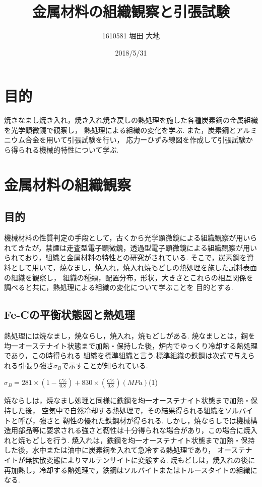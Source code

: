 \documentclass[10pt，a4j]{jsarticle}
\title{\vspace{-2.5cm}金属材料の組織観察と引張試験}
\author{1610581 堀田 大地}
\date{2018/5/31}
\begin{document}
\maketitle{}
\section{目的}
焼きなまし焼き入れ，焼き入れ焼き戻しの熱処理を施した各種炭素鋼の金属組織を光学顕微鏡で観察し，
熱処理による組織の変化を学ぶ.
また，炭素鋼とアルミニウム合金を用いて引張試験を行い，
応力ーひずみ線図を作成して引張試験から得られる機械的特性について学ぶ.
\section{金属材料の組織観察}
  \subsection{目的}
  機械材料の性質判定の手段として，古くから光学顕微鏡による組織観察が用いられてきたが，禁煙は走査型電子顕微鏡，透過型電子顕微鏡による組織観察が用いられており，組織と金属材料の特性との研究がされている.
  そこで，炭素鋼を資料として用いて，焼なまし，焼入れ，焼入れ焼もどしの熱処理を施した試料表面の組織を観察し，
  組織の種類，配置分布，形状，大きさとこれらの相互関係を調べると共に，熱処理による組織の変化について学ぶことを
  目的とする.
  \subsection{Fe-Cの平衡状態図と熱処理}
  熱処理には焼なまし，焼ならし，焼入れ，焼もどしがある.
  焼なましとは，鋼を均一オーステナイト状態まで加熱・保持した後，炉内でゆっくり冷却する熱処理であり，この時得られる
  組織を標準組織と言う.標準組織の鉄鋼は次式で与えられる引張り強さ$σ_{B}$で示すことが知られている.
    \begin{center}
	  $σ_{B} =281 \times (1-\frac{C\%}{0.8})+830 \times (\frac{C\%}{0.8})  (MPa)
      $\quad(1)
  \end{center}
  焼ならしは，焼なまし処理と同様に鉄鋼を均一オーステナイト状態まで加熱・保持した後，
  空気中で自然冷却する熱処理で，その結果得られる組織をソルバイトと呼び，強さと
  靭性の優れた鉄鋼材が得られる.
  しかし，焼ならしでは機械構造用部品等に要求される強さと靭性は十分得られな場合があり，この場合に焼入れと焼もどしを行う.
  焼入れは，鉄鋼を均一オーステナイト状態まで加熱・保持した後，水中または油中に炭素鋼を入れて急冷する熱処理であり，
  オーステナイトが無拡散変態によりマルテンサイトに変態する.
  焼もどしは，焼入れの後に再加熱し，冷却する熱処理で，鉄鋼はソルバイトまたはトルースタイトの組織になる.
  
\end{document}
